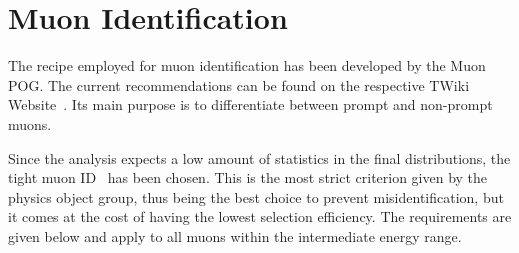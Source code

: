 \section{Muon Identification}
\label{sec:muonid}

The recipe employed for muon identification has been developed by the Muon POG. The current recommendations can be found on the respective TWiki Website~\cite{muonpog}. Its main purpose is to differentiate between prompt and non-prompt muons.

Since the analysis expects a low amount of statistics in the final distributions, the tight muon ID~\cite{muonid1, muonid2} has been chosen. This is the most strict criterion given by the physics object group, thus being the best choice to prevent misidentification, but it comes at the cost of having the lowest selection efficiency. The requirements are given below and apply to all muons within the intermediate energy range.

